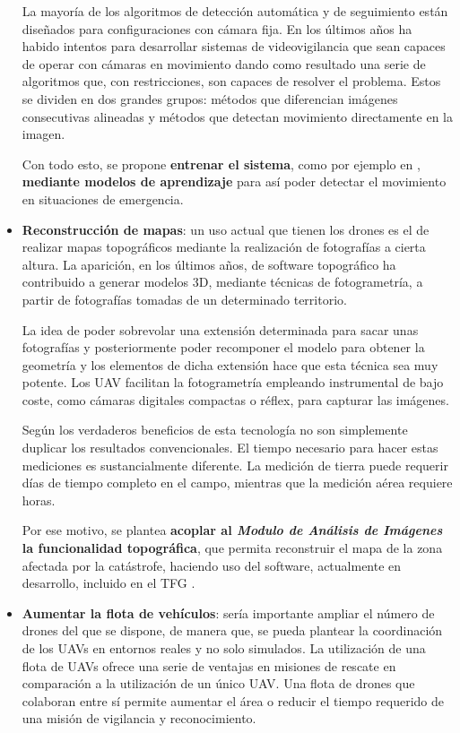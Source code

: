 \begin{itemize}
La mayoría de los algoritmos de detección automática y de seguimiento están diseñados para configuraciones con cámara fija. En los últimos años ha habido intentos para desarrollar sistemas de videovigilancia que sean capaces de operar con cámaras en movimiento dando como resultado una serie de algoritmos que, con restricciones, son capaces de resolver el problema. Estos se dividen en dos grandes grupos: métodos que diferencian imágenes consecutivas alineadas y métodos que detectan movimiento directamente en la imagen.

Con todo esto, se propone \textbf{entrenar el sistema}, como por ejemplo en \cite{futuro1}, \textbf{mediante modelos de aprendizaje} para así poder detectar el movimiento en situaciones de emergencia.

\item \textbf{Reconstrucción de mapas}: un uso actual que tienen los drones es el de realizar mapas topográficos mediante la realización de fotografías a cierta altura. La aparición, en los últimos años, de software topográfico ha contribuido a generar modelos 3D, mediante técnicas de fotogrametría, a partir de fotografías tomadas de un determinado territorio.

La idea de poder sobrevolar una extensión determinada para sacar unas fotografías y posteriormente poder recomponer el modelo para obtener la geometría y los elementos de dicha extensión hace que esta técnica sea muy potente. Los \acs{UAV} facilitan la fotogrametría empleando instrumental de bajo coste, como cámaras digitales compactas o réflex, para capturar las imágenes.

Según \cite{futuro3} los verdaderos beneficios de esta tecnología no son simplemente duplicar los resultados convencionales. El tiempo necesario para hacer estas mediciones es sustancialmente diferente. La medición de tierra puede requerir días de tiempo completo en el campo, mientras que la medición aérea requiere horas.

Por ese motivo, se plantea \textbf{acoplar al \textit{Modulo de Análisis de Imágenes} la funcionalidad topográfica}, que permita reconstruir el mapa de la zona afectada por la catástrofe, haciendo uso del software, actualmente en desarrollo, incluido en el \acs{TFG} \cite{futuro4}.

\item \textbf{Aumentar la flota de vehículos}: sería importante ampliar el número de drones del que se dispone, de manera que, se pueda plantear la coordinación de los \acs{UAV}s en entornos reales y no solo simulados. La utilización de una flota de \acs{UAV}s ofrece una serie de ventajas en misiones de rescate en comparación a la utilización de un único \acs{UAV}. Una flota de drones que colaboran entre sí permite aumentar el área o reducir el tiempo requerido de una misión de vigilancia y reconocimiento.
\end{itemize}






